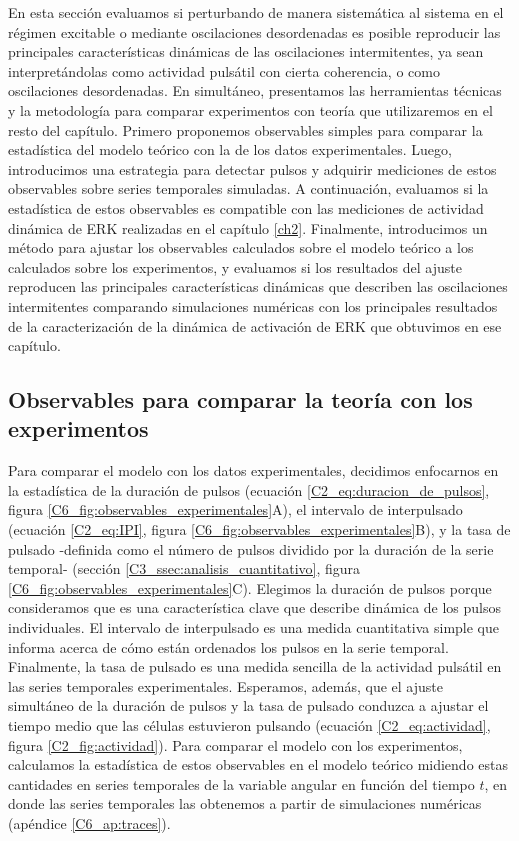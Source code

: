 \documentclass[./main.tex]{subfiles}
\begin{document}
En esta sección evaluamos si perturbando de manera sistemática al sistema en el régimen excitable o mediante oscilaciones desordenadas es posible reproducir las principales características dinámicas de las oscilaciones intermitentes, ya sean interpretándolas como actividad pulsátil con cierta coherencia, o como oscilaciones desordenadas. En simultáneo, presentamos las herramientas técnicas y la metodología para comparar experimentos con teoría que utilizaremos en el resto del capítulo. Primero proponemos observables simples para comparar la estadística del modelo teórico con la de los datos experimentales. Luego, introducimos una estrategia para detectar pulsos y adquirir mediciones de estos observables sobre series temporales simuladas. A continuación, evaluamos si la estadística de estos observables es compatible con las mediciones de actividad dinámica de ERK realizadas en el capítulo \ref{ch2}. Finalmente, introducimos un método para ajustar los observables calculados sobre el modelo teórico a los calculados sobre los experimentos, y evaluamos si los resultados del ajuste reproducen las principales características dinámicas que describen las oscilaciones intermitentes comparando simulaciones numéricas con los principales resultados de la caracterización de la dinámica de activación de ERK que obtuvimos en ese capítulo. 



\subsection{Observables para comparar la teoría con los experimentos}

Para comparar el modelo con los datos experimentales, decidimos enfocarnos en la estadística de la duración de pulsos (ecuación \ref{C2_eq:duracion_de_pulsos}, figura \ref{C6_fig:observables_experimentales}A), el intervalo de interpulsado (ecuación \ref{C2_eq:IPI}, figura \ref{C6_fig:observables_experimentales}B), y la tasa de pulsado -definida como el número de pulsos dividido por la duración de la serie temporal- (sección \ref{C3_ssec:analisis_cuantitativo}, figura \ref{C6_fig:observables_experimentales}C). Elegimos la duración de pulsos porque consideramos que es una característica clave que describe dinámica de los pulsos individuales. El intervalo de interpulsado es una medida cuantitativa simple que informa acerca de cómo están ordenados los pulsos en la serie temporal. Finalmente, la tasa de pulsado es una medida sencilla de la actividad pulsátil en las series temporales experimentales. Esperamos, además, que el ajuste simultáneo de la duración de pulsos y la tasa de pulsado conduzca a ajustar el tiempo medio que las células estuvieron pulsando (ecuación \ref{C2_eq:actividad}, figura \ref{C2_fig:actividad}). Para comparar el modelo con los experimentos, calculamos la estadística de estos observables en el modelo teórico midiendo estas cantidades en series temporales de la variable angular \xx en función del tiempo $t$, en donde las series temporales las obtenemos a partir de simulaciones numéricas (apéndice \ref{C6_ap:traces}).
\end{document}

